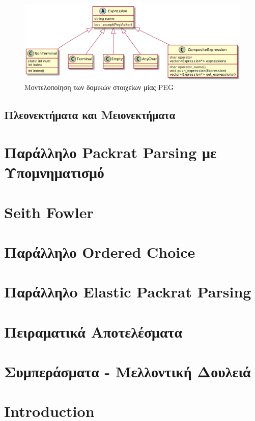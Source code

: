 \documentclass[diploma]{softlab-thesis}
\begin{document}
\begin{figure}[h]
    \centering
	\includegraphics[width=1.10\textwidth]{uml/peg_elements}
	\caption{Μοντελοποίηση των δομικών στοιχείων μίας PEG}
    \label{fig:peg_elements}
\end{figure}

\section{Πλεονεκτήματα και Μειονεκτήματα}
\chapter{ Παράλληλο Packrat Parsing με Υπομνηματισμό }

\chapter{ Seith Fowler}

\chapter{ Παράλληλο Ordered Choice }

\chapter{ Παράλληλo Elastic Packrat Parsing }

\chapter{  Πειραματικά Αποτελέσματα }

\chapter{ Συμπεράσματα - Μελλοντική Δουλειά }

\englishtext

\chapter{Introduction}
\end{document}
